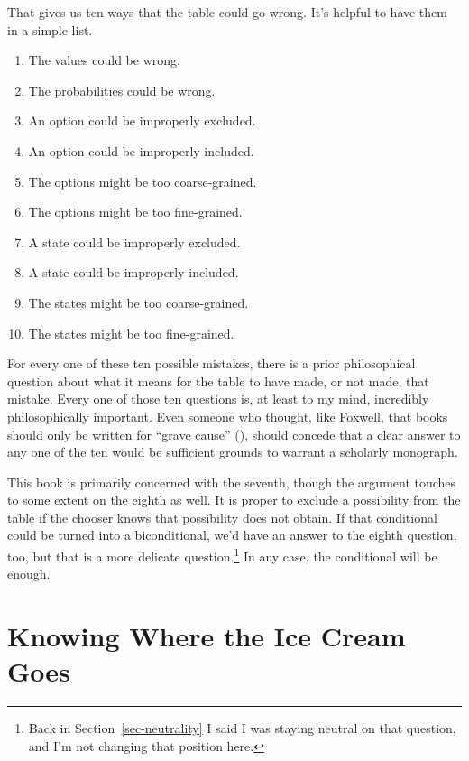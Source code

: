 \documentclass[
  12pt,
  letterpaper,
]{scrbook}
\providecommand{\tightlist}{%
  \setlength{\itemsep}{0pt}\setlength{\parskip}{0pt}}\usepackage{longtable,booktabs,array}
\begin{document}
That gives us ten ways that the table could go wrong. It's helpful to
have them in a simple list.

\begin{enumerate}
\def\labelenumi{\arabic{enumi}.}
\tightlist
\item
  The values could be wrong.
\item
  The probabilities could be wrong.
\item
  An option could be improperly excluded.
\item
  An option could be improperly included.
\item
  The options might be too coarse-grained.
\item
  The options might be too fine-grained.
\item
  A state could be improperly excluded.
\item
  A state could be improperly included.
\item
  The states might be too coarse-grained.
\item
  The states might be too fine-grained.
\end{enumerate}

For every one of these ten possible mistakes, there is a prior
philosophical question about what it means for the table to have made,
or not made, that mistake. Every one of those ten questions is, at least
to my mind, incredibly philosophically important. Even someone who
thought, like Foxwell, that books should only be written for ``grave
cause'' (), should
concede that a clear answer to any one of the ten would be sufficient
grounds to warrant a scholarly monograph.

This book is primarily concerned with the seventh, though the argument
touches to some extent on the eighth as well. It is proper to exclude a
possibility from the table if the chooser knows that possibility does
not obtain. If that conditional could be turned into a biconditional,
we'd have an answer to the eighth question, too, but that is a more
delicate question.\footnote{Back in Section~\ref{sec-neutrality} I said
  I was staying neutral on that question, and I'm not changing that
  position here.} In any case, the conditional will be enough.

\section{Knowing Where the Ice Cream Goes}\label{sec-icecream}
\end{document}
